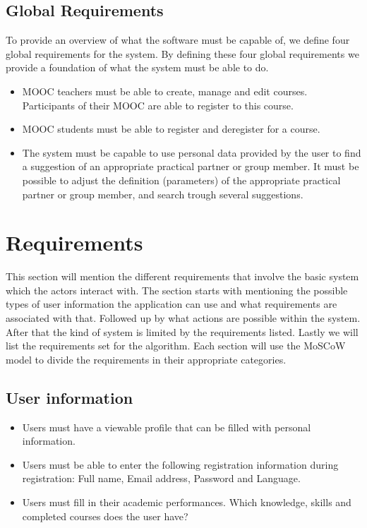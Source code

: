 \subsection*{Global Requirements}
To provide an overview of what the software must be capable of, we define four global requirements for the system.
By defining these four global requirements we provide a foundation of what the system must be able to do.
\begin{itemize}
\item  MOOC teachers must be able to create, manage and edit courses.
Participants of their MOOC are able to register to this course.

\item MOOC students must be able to register and deregister for a course.

\item The system must be capable to use personal data provided by the user to find a suggestion of an appropriate practical partner or group member.
It must be possible to adjust the definition (parameters) of the appropriate practical partner or group member, and search trough several suggestions.
\end{itemize}

\section*{Requirements}
This section will mention the different requirements that involve the basic system which the actors interact with.
The section starts with mentioning the possible types of user information the application can use and what requirements are associated with that.
Followed up by what actions are possible within the system.
After that the kind of system is limited by the requirements listed.
Lastly we will list the requirements set for the algorithm.
Each section will use the MoSCoW model to divide the requirements in their appropriate categories.


\subsection*{User information}
\begin{itemize}
\item Users must have a viewable profile that can be filled with personal information.
\item Users must be able to enter the following registration information during registration: Full name, Email address, Password and Language.
\item Users must fill in their academic performances. Which knowledge, skills and completed courses does the user have?
\end{itemize}

